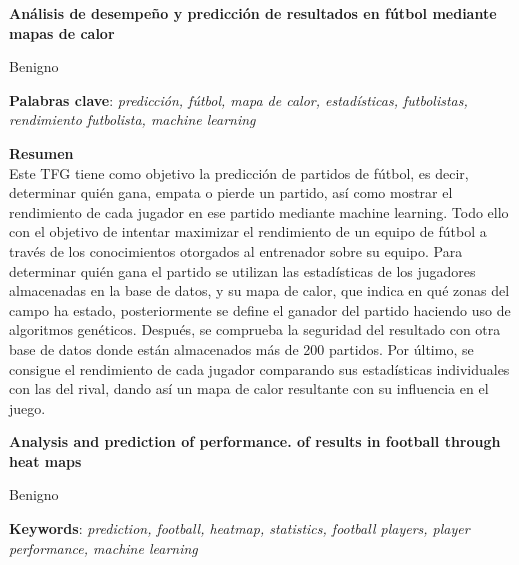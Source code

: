 \thispagestyle{empty}

\begin{center}
{\large\bfseries Análisis de desempeño y predicción
de resultados en fútbol mediante
mapas de calor }\\
\end{center}
\begin{center}
Benigno\\
\end{center}


\vspace{0.5cm}
\noindent\textbf{Palabras clave}: \textit{predicción, fútbol, mapa de calor, estadísticas, futbolistas, rendimiento futbolista, machine learning}
\vspace{0.7cm}

\noindent\textbf{Resumen}\\
Este TFG tiene como objetivo la predicción de partidos de fútbol, es decir, determinar quién gana, empata o pierde un partido, así como mostrar el rendimiento de cada jugador en ese partido mediante machine learning. Todo ello con el objetivo de intentar maximizar el rendimiento de un equipo de fútbol a través de los conocimientos otorgados al entrenador sobre su equipo. Para determinar quién gana el partido se utilizan las estadísticas de los jugadores almacenadas en la base de datos, y su mapa de calor, que indica en qué zonas del campo ha estado, posteriormente se define el ganador del partido haciendo uso de algoritmos genéticos. Después, se comprueba la seguridad del resultado con otra base de datos donde están almacenados más de 200 partidos. Por último, se consigue el rendimiento de cada jugador comparando sus estadísticas individuales con las del rival, dando así un mapa de calor resultante con su influencia en el juego.

\cleardoublepage

\begin{center}
	{\large\bfseries Analysis and prediction of performance.
of results in football through
heat maps}\\
\end{center}
\begin{center}
	Benigno\\
\end{center}
\vspace{0.5cm}
\noindent\textbf{Keywords}: \textit{prediction, football, heatmap, statistics, football players, player performance, machine learning}
\vspace{0.7cm}

